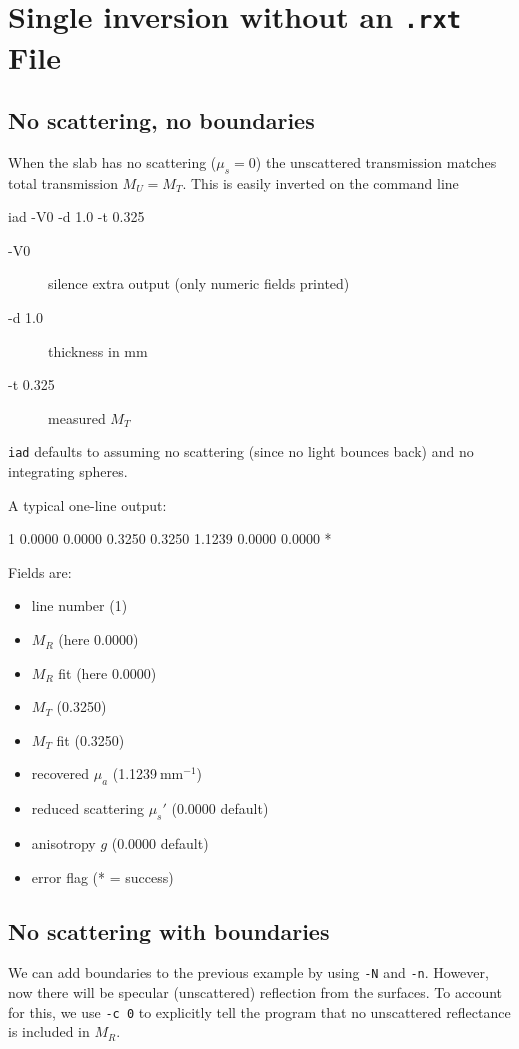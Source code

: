 
\chapter{Single inversion without an \texttt{.rxt} File}

\section{No scattering, no boundaries}
When the slab has no scattering ($\mu_s=0$) the unscattered transmission matches total transmission $M_U=M_T$. This is easily inverted on the command line

\begin{grayverb}
iad -V0 -d 1.0 -t 0.325
\end{grayverb}

\begin{description}
  \item[\ttfamily -V0] silence extra output (only numeric fields printed)  
  \item[\ttfamily -d 1.0] thickness in mm  
  \item[\ttfamily -t 0.325] measured $M_T$  
\end{description}

\texttt{iad} defaults to assuming no scattering (since no light bounces back) and no integrating spheres. 

A typical one-line output:
\begin{grayverb}
1 0.0000 0.0000 0.3250 0.3250 1.1239 0.0000 0.0000 * 
\end{grayverb}

Fields are:
\begin{itemize}
  \item line number (1)
  \item $M_R$ (here 0.0000)  
  \item $M_R$ fit (here 0.0000)  
  \item $M_T$ (0.3250)  
  \item $M_T$ fit (0.3250)  
  \item recovered $\mu_a$ (1.1239 mm$^{-1}$)  
  \item reduced scattering $\mu_s'$ (0.0000 default)  
  \item anisotropy $g$ (0.0000 default)  
  \item error flag (* = success)  
\end{itemize}

\section{No scattering with boundaries}
We can add boundaries to the previous example by using \texttt{-N} and \texttt{-n}.  However, now there will be specular (unscattered) reflection from the surfaces.  To account for this, we use \texttt{-c 0} to explicitly tell the program that no unscattered reflectance is included in $M_R$.

